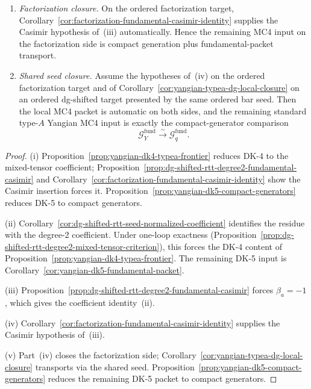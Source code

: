 \begin{corollary}
\begin{enumerate}[label=\textup{(\roman*)}]
\item\emph{Factorization closure.}
  On the ordered factorization target,
  Corollary~\ref{cor:factorization-fundamental-casimir-identity}
  supplies the Casimir hypothesis of~\textup{(iii)} automatically.
  Hence the remaining MC4 input on the factorization side is compact
  generation plus fundamental-packet transport.

\item\emph{Shared seed closure.}
  Assume the hypotheses of~\textup{(iv)} on the ordered factorization
  target and of
  Corollary~\ref{cor:yangian-typea-dg-local-closure} on an ordered
  dg-shifted target presented by the same ordered bar seed.  Then the
  local MC4 packet is automatic on both sides, and the remaining
  standard type-$A$ Yangian MC4 input is exactly the compact-generator
  comparison
  \[
  \mathcal{G}^{\mathrm{fund}}_Y
  \xrightarrow{\sim}
  \mathcal{G}^{\mathrm{fund}}_q.
  \]
\end{enumerate}
\end{corollary}

\begin{proof}
\textup{(i)}
Proposition~\ref{prop:yangian-dk4-typea-frontier} reduces DK-4 to the
mixed-tensor coefficient;
Proposition~\ref{prop:dg-shifted-rtt-degree2-fundamental-casimir}
and Corollary~\ref{cor:factorization-fundamental-casimir-identity}
show the Casimir insertion forces it.
Proposition~\ref{prop:yangian-dk5-compact-generators} reduces DK-5 to
compact generators.

\textup{(ii)}
Corollary~\ref{cor:dg-shifted-rtt-seed-normalized-coefficient}
identifies the residue with the degree-$2$ coefficient.  Under
one-loop exactness
(Proposition~\ref{prop:dg-shifted-rtt-degree2-mixed-tensor-criterion}),
this forces the DK-4 content of
Proposition~\ref{prop:yangian-dk4-typea-frontier}.  The remaining
DK-5 input is
Corollary~\ref{cor:yangian-dk5-fundamental-packet}.

\textup{(iii)}
Proposition~\ref{prop:dg-shifted-rtt-degree2-fundamental-casimir}
forces \(\beta_a=-1\), which gives the coefficient
identity~\textup{(ii)}.

\textup{(iv)}
Corollary~\ref{cor:factorization-fundamental-casimir-identity}
supplies the Casimir hypothesis of~\textup{(iii)}.

\textup{(v)}
Part~\textup{(iv)} closes the factorization side;
Corollary~\ref{cor:yangian-typea-dg-local-closure} transports via
the shared seed.
Proposition~\ref{prop:yangian-dk5-compact-generators} reduces the
remaining DK-5 packet to compact generators.
\end{proof}

